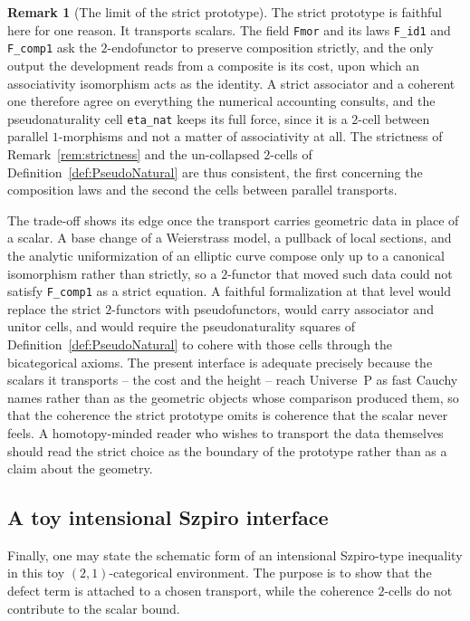 \documentclass[10pt, reqno]{amsart}
\theoremstyle{plain}
\theoremstyle{definition}
\newtheorem{remark}[theorem]{Remark}
\theoremstyle{plain}
\begin{document}
\begin{remark}[The limit of the strict prototype]\label{rem:StrictPrototypeLimit}
The strict prototype is faithful here for one reason. It transports scalars. The field \texttt{Fmor} and its laws \texttt{F\_id1} and \texttt{F\_comp1} ask the $2$-endofunctor to preserve composition strictly, and the only output the development reads from a composite is its cost, upon which an associativity isomorphism acts as the identity. A strict associator and a coherent one therefore agree on everything the numerical accounting consults, and the pseudonaturality cell \texttt{eta\_nat} keeps its full force, since it is a $2$-cell between parallel $1$-morphisms and not a matter of associativity at all. The strictness of Remark~\ref{rem:strictness} and the un-collapsed $2$-cells of Definition~\ref{def:PseudoNatural} are thus consistent, the first concerning the composition laws and the second the cells between parallel transports.

The trade-off shows its edge once the transport carries geometric data in place of a scalar. A base change of a Weierstrass model, a pullback of local sections, and the analytic uniformization of an elliptic curve compose only up to a canonical isomorphism rather than strictly, so a $2$-functor that moved such data could not satisfy \texttt{F\_comp1} as a strict equation. A faithful formalization at that level would replace the strict $2$-functors with pseudofunctors, would carry associator and unitor cells, and would require the pseudonaturality squares of Definition~\ref{def:PseudoNatural} to cohere with those cells through the bicategorical axioms. The present interface is adequate precisely because the scalars it transports -- the cost and the height -- reach Universe~P as fast Cauchy names rather than as the geometric objects whose comparison produced them, so that the coherence the strict prototype omits is coherence that the scalar never feels. A homotopy-minded reader who wishes to transport the data themselves should read the strict choice as the boundary of the prototype rather than as a claim about the geometry.
\end{remark}

\subsection{A toy intensional Szpiro interface}\label{subsec:CoqSzpiro}

Finally, one may state the schematic form of an intensional Szpiro-type inequality in this toy $(2,1)$-categorical environment. The purpose is to show that the defect term is attached to a chosen transport, while the coherence $2$-cells do not contribute to the scalar bound.
\end{document}
